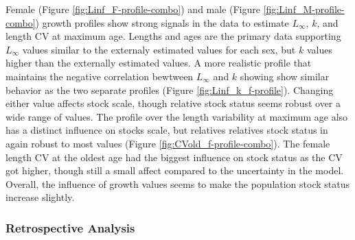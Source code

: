 \documentclass[11pt,
  english,
  a4paper,
]{article}
\begin{document}
\leavevmode\tagmcend\tagstructend\par


Female (Figure \ref{fig:Linf_F-profile-combo}) and male (Figure \ref{fig:Linf_M-profile-combo}) growth profiles show strong signals in the data to estimate {\(L_{\infty}\)\leavevmode\tagmcend\tagstructend}, {\(k\)\leavevmode\tagmcend\tagstructend}, and length CV at maximum age. Lengths and ages are the primary data supporting {\(L_{\infty}\)\leavevmode\tagmcend\tagstructend} values similar to the externaly estimated values for each sex, but {\(k\)\leavevmode\tagmcend\tagstructend} values higher than the externally estimated values. A more realistic profile that maintains the negative correlation bewtween {\(L_{\infty}\)\leavevmode\tagmcend\tagstructend} and {\(k\)\leavevmode\tagmcend\tagstructend} showing show similar behavior as the two separate profiles (Figure \ref{fig:Linf_k_f-profile}). Changing either value affects stock scale, though relative stock status seems robust over a wide range of values. The profile over the length variability at maximum age also has a distinct influence on stocks scale, but relatives relatives stock status in again robust to most values (Figure \ref{fig:CVold_f-profile-combo}). The female length CV at the oldest age had the biggest influence on stock status as the CV got higher, though still a small affect compared to the uncertainty in the model. Overall, the influence of growth values seems to make the population stock status increase slightly.

\leavevmode\tagmcend\tagstructend\par


\hypertarget{retrospective-analysis}{%
\subsubsection{Retrospective Analysis}\label{retrospective-analysis}}

\leavevmode\tagmcend\tagstructend

\end{document}
